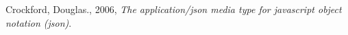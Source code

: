 \begin{thebibliography}{99}

	Crockford, Douglas., 2006, \textit{The application/json media type for javascript object notation (json)}.

\end{thebibliography}